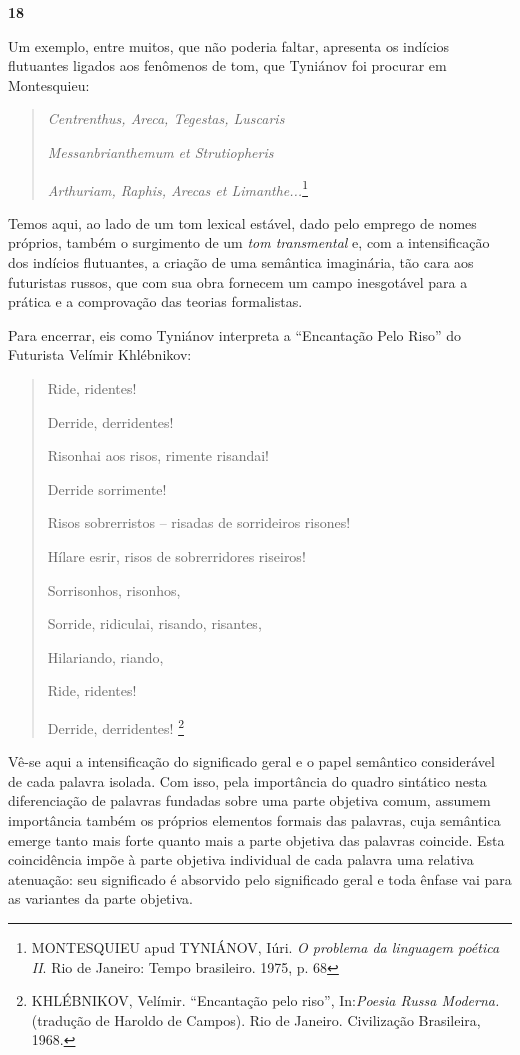 \textbf{18}

Um exemplo, entre muitos, que não poderia faltar, apresenta os indícios
flutuantes ligados aos fenômenos de tom, que Tyniánov foi procurar em
Montesquieu:

\begin{quote}
\emph{Centrenthus, Areca, Tegestas, Luscaris}

\emph{Messanbrianthemum et Strutiopheris}

\emph{Arthuriam, Raphis, Arecas et Limanthe...}\footnote{MONTESQUIEU
  apud TYNIÁNOV, Iúri. \emph{O problema da linguagem poética II}. Rio de
  Janeiro: Tempo brasileiro. 1975, p. 68}
\end{quote}

Temos aqui, ao lado de um tom lexical estável, dado pelo emprego de
nomes próprios, também o surgimento de um \emph{tom transmental} e, com
a intensificação dos indícios flutuantes, a criação de uma semântica
imaginária, tão cara aos futuristas russos, que com sua obra fornecem um
campo inesgotável para a prática e a comprovação das teorias
formalistas.

Para encerrar, eis como Tyniánov interpreta a ``Encantação Pelo Riso''
do Futurista Velímir Khlébnikov:

\begin{quote}
Ride, ridentes!

Derride, derridentes!

Risonhai aos risos, rimente risandai!

Derride sorrimente!

Risos sobrerristos -- risadas de sorrideiros risones!

Hílare esrir, risos de sobrerridores riseiros!

Sorrisonhos, risonhos,

Sorride, ridiculai, risando, risantes,

Hilariando, riando,

Ride, ridentes!

Derride, derridentes! \footnote{KHLÉBNIKOV, Velímir. ``Encantação pelo
  riso'', In:\emph{Poesia Russa Moderna.}(tradução de Haroldo de
  Campos). Rio de Janeiro. Civilização Brasileira, 1968.}
\end{quote}

Vê-se aqui a intensificação do significado geral e o papel semântico
considerável de cada palavra isolada. Com isso, pela importância do
quadro sintático nesta diferenciação de palavras fundadas sobre uma
parte objetiva comum, assumem importância também os próprios elementos
formais das palavras, cuja semântica emerge tanto mais forte quanto mais
a parte objetiva das palavras coincide. Esta coincidência impõe à parte
objetiva individual de cada palavra uma relativa atenuação: seu
significado é absorvido pelo significado geral e toda ênfase vai para as
variantes da parte objetiva.

